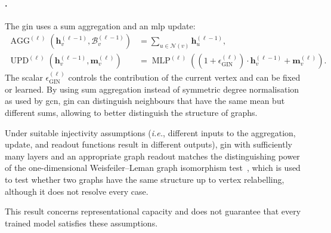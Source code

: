 \paragraph{.}
The \gls{gin}\citep{XuEtAl19} uses a sum aggregation and an \gls{mlp} update:
\begin{equation}
\label{eq:ch07:gin}
\begin{aligned}
    \operatorname{AGG}^{(\ell)}\!\left(\mathbf{h}_v^{(\ell-1)},\mathcal B_v^{(\ell-1)}\right)
        &=\sum_{u\in \mathcal N(v)}\mathbf{h}_u^{(\ell-1)}, \\
    \operatorname{UPD}^{(\ell)}\!\left(\mathbf{h}_v^{(\ell-1)},\mathbf{m}_v^{(\ell)}\right)
        &=\operatorname{MLP}^{(\ell)}\!\left((1+\epsilon_{\mathrm{GIN}}^{(\ell)})\cdot \mathbf{h}_v^{(\ell-1)}+\mathbf{m}_v^{(\ell)}\right).
\end{aligned}
\end{equation}
The scalar $\epsilon_{\mathrm{GIN}}^{(\ell)}$ controls the contribution of the current vertex and can be fixed or learned. By using sum aggregation instead of symmetric degree normalisation as used by \gls{gcn}, \gls{gin} can distinguish neighbours that have the same mean but different sums, allowing to better distinguish the structure of graphs.

Under suitable injectivity assumptions (\emph{i.e.}, different inputs to the aggregation, update, and readout functions result in different outputs), \gls{gin} with sufficiently many layers and an appropriate graph readout matches the distinguishing power of the one-dimensional Weisfeiler--Leman graph isomorphism test~\citep{XuEtAl19}, which is used to test whether two graphs have the same structure up to vertex relabelling, although it does not resolve every case.

This result concerns representational capacity and does not guarantee that every trained model satisfies these assumptions.



